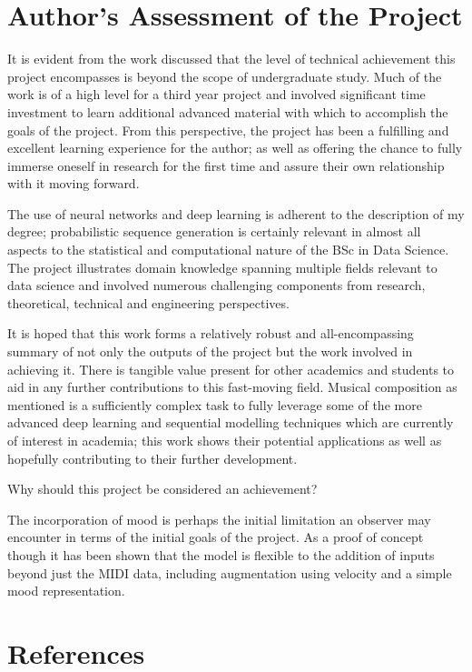 \documentclass[12pt,]{article}
\begin{document}
\hypertarget{authors-assessment-of-the-project}{%
\section{Author's Assessment of the
Project}\label{authors-assessment-of-the-project}}

It is evident from the work discussed that the level of technical
achievement this project encompasses is beyond the scope of
undergraduate study. Much of the work is of a high level for a third
year project and involved significant time investment to learn
additional advanced material with which to accomplish the goals of the
project. From this perspective, the project has been a fulfilling and
excellent learning experience for the author; as well as offering the
chance to fully immerse oneself in research for the first time and
assure their own relationship with it moving forward.

The use of neural networks and deep learning is adherent to the
description of my degree; probabilistic sequence generation is certainly
relevant in almost all aspects to the statistical and computational
nature of the BSc in Data Science. The project illustrates domain
knowledge spanning multiple fields relevant to data science and involved
numerous challenging components from research, theoretical, technical
and engineering perspectives.

It is hoped that this work forms a relatively robust and
all-encompassing summary of not only the outputs of the project but the
work involved in achieving it. There is tangible value present for other
academics and students to aid in any further contributions to this
fast-moving field. Musical composition as mentioned is a sufficiently
complex task to fully leverage some of the more advanced deep learning
and sequential modelling techniques which are currently of interest in
academia; this work shows their potential applications as well as
hopefully contributing to their further development.

Why should this project be considered an achievement?

The incorporation of mood is perhaps the initial limitation an observer
may encounter in terms of the initial goals of the project. As a proof
of concept though it has been shown that the model is flexible to the
addition of inputs beyond just the MIDI data, including augmentation
using velocity and a simple mood representation.

\hypertarget{references}{%
\section*{References}\label{references}}
\end{document}
